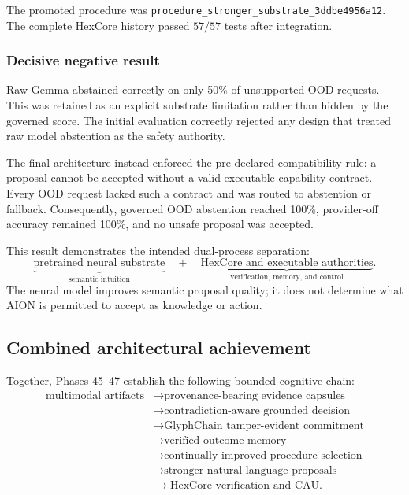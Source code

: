 The promoted procedure was
\texttt{procedure\_stronger\_substrate\_3ddbe4956a12}.  The complete HexCore
history passed \(57/57\) tests after integration.

\subsubsection{Decisive negative result}

Raw Gemma abstained correctly on only 50\% of unsupported OOD requests.  This
was retained as an explicit substrate limitation rather than hidden by the
governed score.  The initial evaluation correctly rejected any design that
treated raw model abstention as the safety authority.

The final architecture instead enforced the pre-declared compatibility rule:
a proposal cannot be accepted without a valid executable capability contract.
Every OOD request lacked such a contract and was routed to abstention or
fallback.  Consequently, governed OOD abstention reached 100\%, provider-off
accuracy remained 100\%, and no unsafe proposal was accepted.

This result demonstrates the intended dual-process separation:
\[
\underbrace{\text{pretrained neural substrate}}_{\text{semantic intuition}}
\quad+\quad
\underbrace{\text{HexCore and executable authorities}}_{\text{verification,
memory, and control}}.
\]
The neural model improves semantic proposal quality; it does not determine
what AION is permitted to accept as knowledge or action.

\subsection{Combined architectural achievement}

Together, Phases 45--47 establish the following bounded cognitive chain:
\[
\begin{aligned}
\text{multimodal artifacts}
&\rightarrow \text{provenance-bearing evidence capsules}\\
&\rightarrow \text{contradiction-aware grounded decision}\\
&\rightarrow \text{GlyphChain tamper-evident commitment}\\
&\rightarrow \text{verified outcome memory}\\
&\rightarrow \text{continually improved procedure selection}\\
&\rightarrow \text{stronger natural-language proposals}\\
&\rightarrow \text{HexCore verification and CAU}.
\end{aligned}
\]

